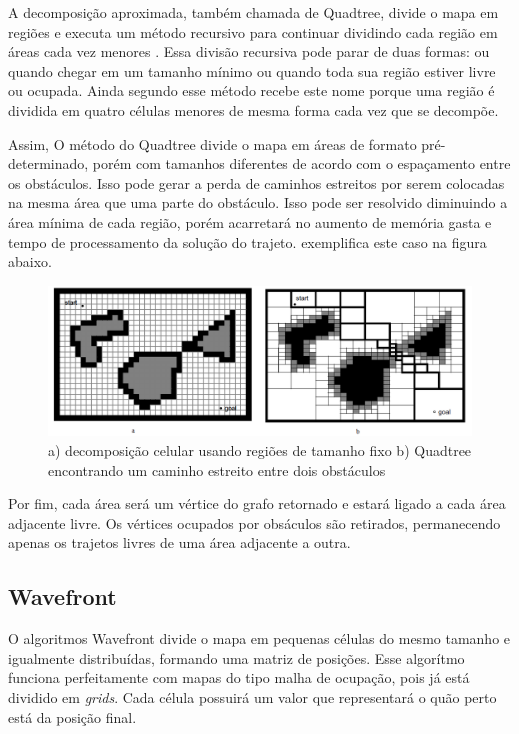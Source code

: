 A decomposição aproximada, também chamada de Quadtree, divide o mapa em regiões e executa um método recursivo para continuar dividindo cada região em áreas cada vez menores \cite{Thomsen2010}. Essa divisão recursiva pode parar de duas formas: ou quando chegar em um tamanho mínimo ou quando toda sua região estiver livre ou ocupada. Ainda segundo \cite{Thomsen2010} esse método recebe este nome porque uma região é dividida em quatro células menores de mesma forma cada vez que se decompõe.

Assim, O método do Quadtree divide o mapa em áreas de formato pré-determinado, porém com tamanhos diferentes de acordo com o espaçamento entre os obstáculos. Isso pode gerar a perda de caminhos estreitos por serem colocadas na mesma área que uma parte do obstáculo. Isso pode ser resolvido diminuindo a área mínima de cada região, porém acarretará no aumento de memória gasta e tempo de processamento da solução do trajeto. \cite{Siegwart2004} exemplifica este caso na figura abaixo.

\begin{figure}[h]
	\centering
	\label{fig09}
		\includegraphics[keepaspectratio=true,scale=0.5]{figuras/9quadtree.png}
	\caption{ a) decomposição celular usando regiões de tamanho fixo b) Quadtree encontrando um caminho estreito entre dois obstáculos \cite{Siegwart2004}}
\end{figure}

Por fim, cada área será um vértice do grafo retornado e estará ligado a cada área adjacente livre.  Os vértices ocupados por obsáculos são retirados, permanecendo apenas os trajetos livres de uma área adjacente a outra.

\subsection{Wavefront}

O algoritmos Wavefront divide o mapa em pequenas células do mesmo tamanho e igualmente distribuídas, formando uma matriz de posições. Esse algorítmo funciona perfeitamente com mapas do tipo malha de ocupação, pois já está dividido em \textit{grids}. Cada célula possuirá um valor que representará o quão perto está da posição final.

